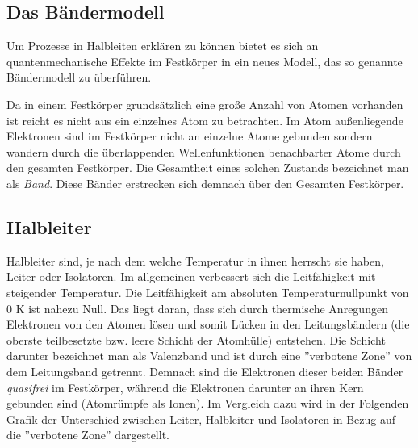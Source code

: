 \documentclass{article}
\begin{document}
\subsection{Das Bändermodell}
Um Prozesse in Halbleiten erklären zu können bietet es sich an quantenmechanische Effekte im Festkörper in ein neues Modell, das so genannte Bändermodell zu überführen.

Da in einem Festkörper grundsätzlich eine große Anzahl von Atomen vorhanden ist reicht es nicht aus ein einzelnes Atom zu betrachten. Im Atom außenliegende Elektronen sind im Festkörper nicht an einzelne Atome gebunden sondern wandern durch die überlappenden Wellenfunktionen benachbarter Atome durch den gesamten Festkörper. Die Gesamtheit eines solchen Zustands bezeichnet man als {\it Band}.
Diese Bänder erstrecken sich demnach über den Gesamten Festkörper. 

\subsection{Halbleiter}
Halbleiter sind, je nach dem welche Temperatur in ihnen herrscht sie haben, Leiter oder Isolatoren. Im allgemeinen verbessert sich die Leitfähigkeit mit steigender Temperatur. Die Leitfähigkeit am absoluten Temperaturnullpunkt von 0 K ist nahezu Null. 
Das liegt daran, dass sich durch thermische Anregungen Elektronen von den Atomen lösen und somit 
Lücken in den Leitungsbändern (die oberste teilbesetzte bzw. leere Schicht der Atomhülle) 
entstehen. Die 
Schicht darunter bezeichnet man als Valenzband und ist durch eine ''verbotene Zone'' von dem 
Leitungsband getrennt. Demnach sind die Elektronen dieser beiden Bänder {\it quasifrei} im 
Festkörper, während die Elektronen darunter an ihren Kern gebunden sind (Atomrümpfe als Ionen). 
Im Vergleich dazu wird in der Folgenden Grafik der Unterschied zwischen Leiter, 
Halbleiter und Isolatoren in Bezug 
auf die ''verbotene Zone'' dargestellt.
\begin{center}
\begin{minipage}{\linewidth}
\centering
{}
%
\label{halbleiter}
\end{minipage}
\end{center}
\end{document}
